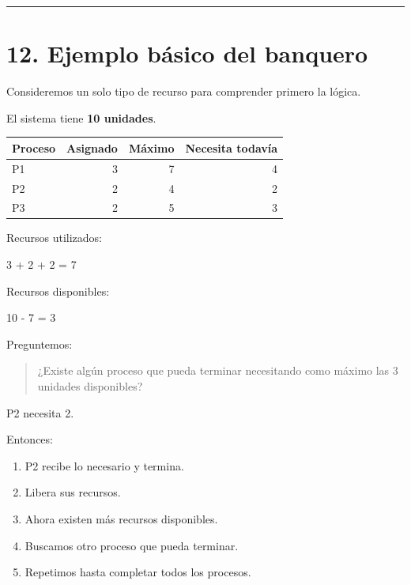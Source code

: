 \documentclass[
  spanish,
  letterpaper,
]{scrbook}
\newenvironment{Shaded}{\begin{snugshade}}{\end{snugshade}}
\newcommand{\NormalTok}[1]{\textcolor[rgb]{0.00,0.23,0.31}{#1}}
\newcounter{none} %
\providecommand{\tightlist}{%
  \setlength{\itemsep}{0pt}\setlength{\parskip}{0pt}}
\begin{document}
\begin{center}\rule{0.5\linewidth}{0.5pt}\end{center}


\chapter{12. Ejemplo básico del
banquero}\label{ejemplo-buxe1sico-del-banquero}

Consideremos un solo tipo de recurso para comprender primero la lógica.

El sistema tiene \textbf{10 unidades}.

{\def\LTcaptype{none} %
\begin{longtable}[]{@{}lrrr@{}}
\toprule\noalign{}
Proceso & Asignado & Máximo & Necesita todavía \\
\midrule\noalign{}
\endhead
\bottomrule\noalign{}
\endlastfoot
P1 & 3 & 7 & 4 \\
P2 & 2 & 4 & 2 \\
P3 & 2 & 5 & 3 \\
\end{longtable}
}

Recursos utilizados:

\begin{Shaded}
\begin{Highlighting}[]
\NormalTok{3 + 2 + 2 = 7}
\end{Highlighting}
\end{Shaded}

Recursos disponibles:

\begin{Shaded}
\begin{Highlighting}[]
\NormalTok{10 {-} 7 = 3}
\end{Highlighting}
\end{Shaded}

Preguntemos:

\begin{quote}
¿Existe algún proceso que pueda terminar necesitando como máximo las 3
unidades disponibles?
\end{quote}

P2 necesita 2.

Entonces:

\begin{enumerate}
\def\labelenumi{\arabic{enumi}.}
\tightlist
\item
  P2 recibe lo necesario y termina.
\item
  Libera sus recursos.
\item
  Ahora existen más recursos disponibles.
\item
  Buscamos otro proceso que pueda terminar.
\item
  Repetimos hasta completar todos los procesos.
\end{enumerate}
\end{document}
